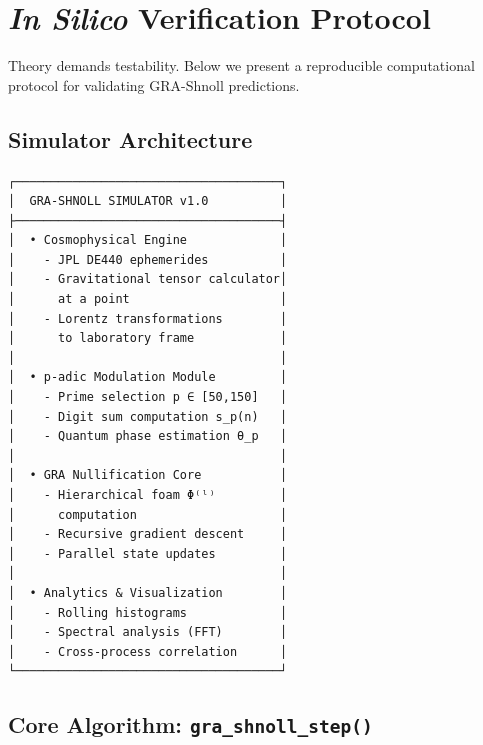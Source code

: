 \documentclass[12pt,a4paper]{article}
\theoremstyle{plain}
\theoremstyle{definition}
\theoremstyle{remark}
\begin{document}
\section{\textit{In Silico} Verification Protocol}
\label{sec:verification}

Theory demands testability. Below we present a reproducible computational protocol for validating GRA-Shnoll predictions.

\subsection{Simulator Architecture}

\begin{lstlisting}[caption={Simulator module structure}, label={lst:simulator-arch}]
┌─────────────────────────────────────┐
│  GRA-SHNOLL SIMULATOR v1.0          │
├─────────────────────────────────────┤
│  • Cosmophysical Engine             │
│    - JPL DE440 ephemerides          │
│    - Gravitational tensor calculator│
│      at a point                     │
│    - Lorentz transformations        │
│      to laboratory frame            │
│                                     │
│  • p-adic Modulation Module         │
│    - Prime selection p ∈ [50,150]   │
│    - Digit sum computation s_p(n)   │
│    - Quantum phase estimation θ_p   │
│                                     │
│  • GRA Nullification Core           │
│    - Hierarchical foam Φ⁽ˡ⁾         │
│      computation                    │
│    - Recursive gradient descent     │
│    - Parallel state updates         │
│                                     │
│  • Analytics & Visualization        │
│    - Rolling histograms             │
│    - Spectral analysis (FFT)        │
│    - Cross-process correlation      │
└─────────────────────────────────────┘
\end{lstlisting}

\subsection{Core Algorithm: \texttt{gra\_shnoll\_step()}}
\end{document}

